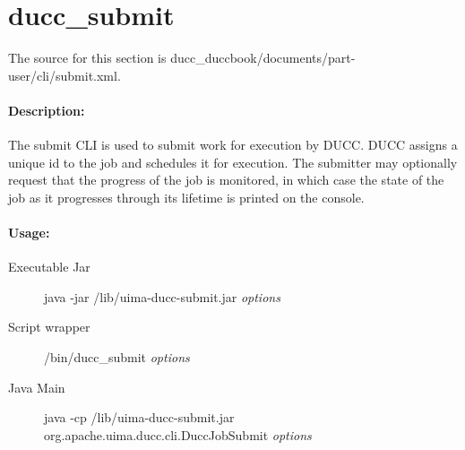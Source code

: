 \ifpdf
\else
{}
\fi

    \section{ducc\_submit}
    \label{sec:cli.ducc-submit}
       The source for this section is ducc\_duccbook/documents/part-user/cli/submit.xml.
       \paragraph{Description:}
           The submit CLI is used to submit work for execution by DUCC. DUCC assigns a unique id to the
           job and schedules it for execution. The submitter may optionally request that the progress of
           the job is monitored, in which case the state of the job as it progresses through its
           lifetime is printed on the console.
       \paragraph{Usage:}
           \begin{description}
             \item[Executable Jar] java -jar \ducchome/lib/uima-ducc-submit.jar {\em options}
             \item[Script wrapper] \ducchome/bin/ducc\_submit {\em options}
             \item[Java Main]      java -cp \ducchome/lib/uima-ducc-submit.jar org.apache.uima.ducc.cli.DuccJobSubmit {\em options}
           \end{description}

